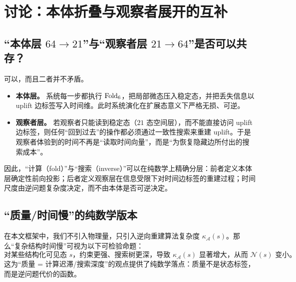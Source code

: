
\section{讨论：本体折叠与观察者展开的互补}

\subsection{“本体层 $64\to 21$”与“观察者层 $21\to 64$”是否可以共存？}

可以，而且二者并不矛盾。
\begin{itemize}
  \item \textbf{本体层。} 系统每一步都执行 $\mathrm{Fold}_6$，把局部微态压入稳定态，并把丢失信息以 uplift 边标签写入时间维。此时系统演化在扩展态意义下严格无损、可逆。
  \item \textbf{观察者层。} 若观察者只能读到稳定态（$21$ 态空间层），而不能直接访问 uplift 边标签，则任何“回到过去”的操作都必须通过一致性搜索来重建 uplift。于是观察者体验到的时间不再是“读取时间向量”，而是“为恢复隐藏边所付出的搜索成本”。
\end{itemize}

因此，“计算（fold）”与“搜索（inverse）”可以在纯数学上精确分层：前者定义本体层确定性前向投影；后者定义观察层在信息受限下对时间边标签的重建过程；时间尺度由逆问题复杂度决定，而不由本体是否可逆决定。

\subsection{“质量/时间慢”的纯数学版本}

在本文框架中，我们不引入物理量，只引入逆向重建算法复杂度 $\kappa_{\mathcal{A}}(s)$。那么“复杂结构时间慢”可视为以下可检验命题：
$$
\text{对某些结构化可见态 }s\text{，约束更强、搜索树更深，导致 }\kappa_{\mathcal{A}}(s)\text{ 显著增大，从而 }\mathcal{N}(s)\text{ 变小。}
$$
这为“质量 = 计算迟滞/搜索深度”的观点提供了纯数学落点：质量不是状态标签，而是逆问题代价的函数。

